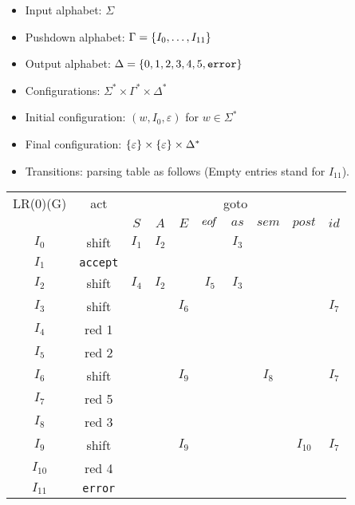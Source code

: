 \begin{solution}
\begin{enumerate}[(a)]
\begin{itemize}
  \item Input alphabet: $\Sigma$
  \item Pushdown alphabet: $\Gamma = \left\{ I_0, \dots, I_{11} \right\}$
  \item Output alphabet: $\Delta = \left\{ 0,1,2,3,4,5, \mathtt{error} \right\}$
  \item Configurations: $\Sigma^* \times \Gamma^* \times \Delta^*$
  \item Initial configuration: $(w, I_0, \varepsilon)$ for $w \in \Sigma^*$
  \item Final configuration: $\left\{ \varepsilon \right\} \times \left\{ \varepsilon \right\} \times \Delta^*$
  \item Transitions: parsing table as follows (Empty entries stand for $I_{11}$).
\end{itemize}

    \begin{center}
    \begin{tabular}{c | c | c c c c c c c c }
      LR(0)(G) & act    & \multicolumn{8}{c}{goto}\\
               &        & $S$ & $A$ & $E$ & $eo\!f$ & $as$ & $sem$ & $post$ & $id$\\
      \hline
      $I_0$    & shift  & $I_1$ & $I_2$ &  & & $I_3$ & \\
      $I_1$    & \texttt{accept} &\\
      $I_2$    & shift  & $I_4$ & $I_2$ & & $I_5$ & $I_3$ & \\
      $I_3$    & shift  & & & $I_6$ & & & &  & $I_7$ \\
      $I_4$    & red 1  & \\
      $I_5$    & red 2  & \\
      $I_6$    & shift  & & & $I_9$ & & & $I_8$ & & $I_7$\\
      $I_7$    & red 5  & \\
      $I_8$    & red 3  & \\
      $I_9$    & shift  & & & $I_9$ & & & & $I_{10}$ & $I_7$ \\
      $I_{10}$ & red 4  & \\
      $I_{11}$ & \texttt{error} &
    \end{tabular}
    \end{center}


\end{enumerate}
\end{solution}
